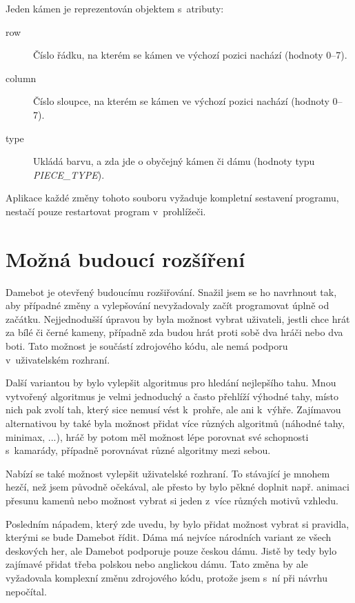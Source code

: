 \documentclass[a4paper,12pt]{article}
\begin{document}
	Jeden kámen je reprezentován objektem s~atributy:
		\begin{description}
			\item[row] Číslo řádku, na kterém se kámen ve výchozí pozici nachází (hodnoty 0--7).
			\item[column] Číslo sloupce, na kterém se kámen ve výchozí pozici nachází (hodnoty 0--7).
			\item[type] Ukládá barvu, a zda jde o obyčejný kámen či dámu (hodnoty typu \textit{PIECE\_TYPE}).
		\end{description}

	Aplikace každé změny tohoto souboru vyžaduje kompletní sestavení programu, nestačí pouze restartovat program v~prohlížeči.

	\section{Možná budoucí rozšíření}
	Damebot je otevřený budoucímu rozšiřování. Snažil jsem se ho navrhnout tak, aby případné změny a vylepšování
	nevyžadovaly začít programovat úplně od začátku. Nejjednodušší úpravou by byla možnost vybrat uživateli, jestli
	chce hrát za bílé či černé kameny, případně zda budou hrát proti sobě dva hráči nebo dva boti. Tato možnost je
	součástí zdrojového kódu, ale nemá podporu v~uživatelském rozhraní.
	
	Další variantou by bylo vylepšit algoritmus pro hledání nejlepšího tahu. Mnou vytvořený algoritmus je velmi
	jednoduchý a často přehlíží výhodné tahy, místo nich pak zvolí tah, který sice nemusí vést k~prohře, ale ani
	k~výhře. Zajímavou alternativou by také byla možnost přidat více různých algoritmů (náhodné tahy, minimax, ...),
	hráč by potom měl možnost lépe porovnat své schopnosti s~kamarády, případně porovnávat různé algoritmy
	mezi sebou.
	
	Nabízí se také možnost vylepšit uživatelské rozhraní. To stávající je mnohem hezčí, než jsem původně očekával,
	ale přesto by bylo pěkné doplnit např. animaci přesunu kamenů nebo možnost vybrat si jeden z~více různých motivů vzhledu.
	
	Posledním nápadem, který zde uvedu, by bylo přidat možnost vybrat si pravidla, kterými se bude Damebot řídit.
	Dáma má nejvíce národních variant ze všech deskových her, ale Damebot podporuje pouze českou dámu. Jistě by
	tedy bylo zajímavé přidat třeba polskou nebo anglickou dámu. Tato změna by ale vyžadovala komplexní změnu
	zdrojového kódu, protože jsem s~ní při návrhu nepočítal.
\end{document}
